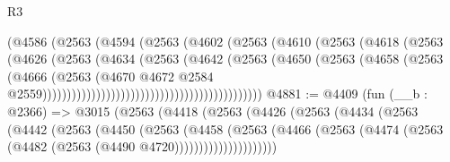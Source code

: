 \begin{lexlean}{R3}
\begin{coremodule}
                                                (@4586
                                                  (@2563
                                                    (@4594
                                                      (@2563
                                                        (@4602
                                                          (@2563
                                                            (@4610
                                                              (@2563
                                                                (@4618
                                                                  (@2563
                                                                    (@4626
                                                                      (@2563
                                                                        (@4634
                                                                          (@2563
                                                                            (@4642
                                                                              (@2563
                                                                                (@4650
                                                                                  (@2563
                                                                                    (@4658
                                                                                      (@2563
                                                                                        (@4666
                                                                                          (@2563
                                                                                            (@4670
                                                                                              @4672
                                                                                              @2584
                                                                                              @2559)))))))))))))))))))))))))))))))))))))))))))))
@4881 := @4409
    (fun (__b : @2366) =>
    @3015
      (@2563
        (@4418
          (@2563
            (@4426
              (@2563
                (@4434
                  (@2563
                    (@4442
                      (@2563
                        (@4450
                          (@2563
                            (@4458
                              (@2563
                                (@4466
                                  (@2563
                                    (@4474 (@2563 (@4482 (@2563 (@4490 @4720)))))))))))))))))))))

\end{coremodule}
\end{lexlean}
